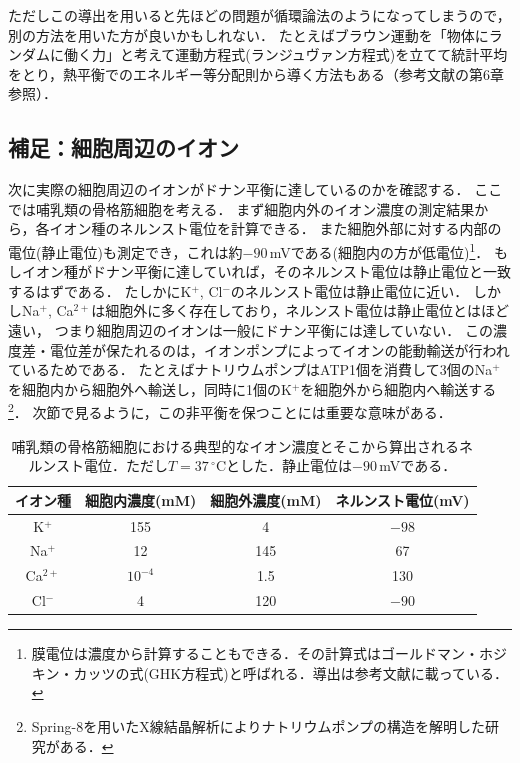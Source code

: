 \documentclass[a4paper,11pt]{jsarticle}
\begin{document}
ただしこの導出を用いると先ほどの問題が循環論法のようになってしまうので，別の方法を用いた方が良いかもしれない．
たとえばブラウン運動を「物体にランダムに働く力」と考えて運動方程式(ランジュヴァン方程式)を立てて統計平均をとり，熱平衡でのエネルギー等分配則から導く方法もある（参考文献\cite{srs}の第6章参照）．

\subsection{補足：細胞周辺のイオン}
次に実際の細胞周辺のイオンがドナン平衡に達しているのかを確認する．
ここでは哺乳類の骨格筋細胞を考える．
まず細胞内外のイオン濃度の測定結果から，各イオン種のネルンスト電位を計算できる．
また細胞外部に対する内部の電位(静止電位)も測定でき，これは約$-90$\,mVである(細胞内の方が低電位)\footnote{膜電位は濃度から計算することもできる．その計算式はゴールドマン・ホジキン・カッツの式(GHK方程式)と呼ばれる．導出は参考文献\cite{ghk}に載っている．}．
もしイオン種がドナン平衡に達していれば，そのネルンスト電位は静止電位と一致するはずである．
たしかにK$^+$, Cl$^-$のネルンスト電位は静止電位に近い．
しかしNa$^+$, Ca$^{2+}$は細胞外に多く存在しており，ネルンスト電位は静止電位とはほど遠い，
つまり細胞周辺のイオンは一般にドナン平衡には達していない．
この濃度差・電位差が保たれるのは，イオンポンプによってイオンの能動輸送が行われているためである．
たとえばナトリウムポンプはATP1個を消費して3個のNa$^{+}$を細胞内から細胞外へ輸送し，同時に1個のK$^{+}$を細胞外から細胞内へ輸送する\footnote{Spring-8を用いたX線結晶解析によりナトリウムポンプの構造を解明した研究がある\cite{ponp}．}．
次節で見るように，この非平衡を保つことには重要な意味がある．

\begin{table}[htbp]
  \centering
  \caption{哺乳類の骨格筋細胞における典型的なイオン濃度とそこから算出されるネルンスト電位．ただし$T=37\,{}^\circ\mathrm{C}$とした．静止電位は$-90$\,mVである．}
  \label{tab:ions}
  \begin{tabular}{c|c|c|c}
    \hline
    イオン種 & 細胞内濃度(mM) & 細胞外濃度(mM) & ネルンスト電位(mV) \\
    \hline
    K$^+$ & 155 & 4 & $-98$ \\
    Na$^+$ & 12 & 145 & 67 \\
    Ca$^{2+}$ & $10^{-4}$ & 1.5 & 130 \\
    Cl$^{-}$ & 4 & 120 & $-90$ \\
    \hline
  \end{tabular}
\end{table}
\end{document}
